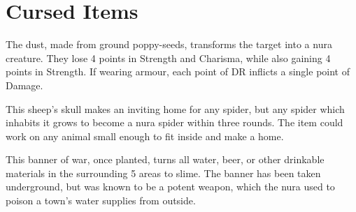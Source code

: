 \section{Cursed Items}

\begin{multicols}{2}

\label{ogredust}

The dust, made from ground poppy-seeds, transforms the target into a nura creature.
They lose 4 points in Strength and Charisma, while also gaining 4 points in Strength.
If wearing armour, each point of DR inflicts a single point of Damage.

\label{spiderskull}

This sheep's skull makes an inviting home for any spider, but any spider which inhabits it grows to become a nura spider within three rounds.
The item could work on any animal small enough to fit inside and make a home.


This banner of war, once planted, turns all water, beer, or other drinkable materials in the surrounding 5 areas to slime.
The banner has been taken underground, but was known to be a potent weapon, which the nura used to poison a town's water supplies from outside.

\end{multicols}
